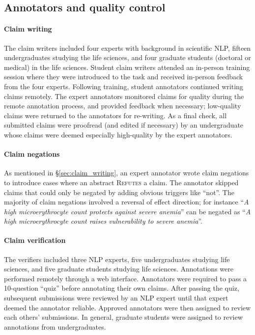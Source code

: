 \documentclass[11pt,a4paper]{article}
\newcommand{\refutes}{\textsc{Refutes}\xspace}
\begin{document}
\subsection{Annotators and quality control}

\paragraph{Claim writing} The claim writers included four experts with background in scientific NLP, fifteen undergraduates studying the life sciences, and four graduate students (doctoral or medical) in the life sciences. Student claim writers attended an in-person training session where they were introduced to the task and received in-person feedback from the four experts. Following training, student annotators continued writing claims remotely. The expert annotators monitored claims for quality during the remote annotation process, and provided feedback when necessary; low-quality claims were returned to the annotators for re-writing. As a final check, all submitted claims were proofread (and edited if necessary) by an undergraduate whose claims were deemed especially high-quality by the expert annotators.

\paragraph{Claim negations}

As mentioned in \S\ref{sec:claim_writing}, an expert annotator wrote claim negations to introduce cases where an abstract \refutes a claim. The annotator skipped claims that could only be negated by adding obvious triggers like ``not''. The majority of claim negations involved a reversal of effect direction; for instance ``\emph{A high microerythrocyte count protects against severe anemia}'' can be negated as ``\emph{A high microerythrocyte count raises vulnerability to severe anemia}''.

\paragraph{Claim verification}

The verifiers included three NLP experts, five undergraduates studying life sciences, and five graduate students studying life sciences. Annotations were performed remotely through a web interface. Annotators were required to pass a 10-question ``quiz'' before annotating their own claims. After passing the quiz, subsequent submissions were reviewed by an NLP expert until that expert deemed the annotator reliable. Approved annotators were then assigned to review each others' submissions. In general, graduate students were assigned to review annotations from undergraduates.
\end{document}
